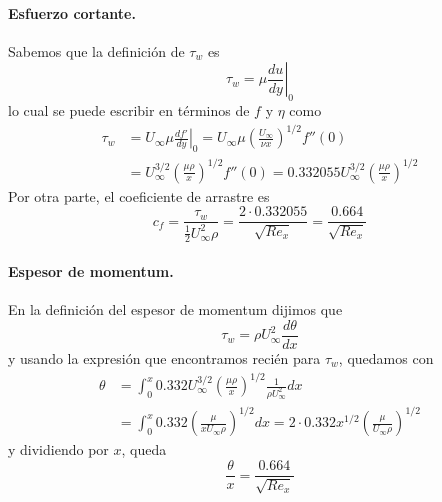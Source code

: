\paragraph*{Esfuerzo cortante.}
Sabemos que la definición de $\tau_w$ es
%
\begin{equation}
\tau_w = \left.\mu\frac{du}{dy}\right|_0
\end{equation}
%
lo cual se puede escribir en términos de $f$ y $\eta$ como
%
\begin{align}
\tau_w &= \left. U_\infty\mu \frac{df'}{dy}\right|_0 = U_\infty\mu \left(\frac{U_\infty}{\nu x}\right)^{1/2}f''(0) \nonumber\\
&= U_\infty^{3/2}\left(\frac{\mu\rho}{x}\right)^{1/2}f''(0) = 0.332055 U_\infty^{3/2}\left(\frac{\mu\rho}{x}\right)^{1/2} 
\end{align}
%
Por otra parte, el coeficiente de arrastre es
%
\begin{equation}
c_f = \frac{\tau_w}{\frac{1}{2}U_\infty^2\rho} = \frac{2\cdot0.332055}{\sqrt{Re_x}} = \frac{0.664}{\sqrt{Re_x}}
\end{equation}

\paragraph*{Espesor de momentum.}
En la definición del espesor de momentum dijimos que
%
\begin{equation}
\tau_w = \rho U_\infty^2 \frac{d\theta}{dx}
\end{equation}
%
y usando la expresión que encontramos recién para $\tau_w$, quedamos con
%
\begin{align}
\theta &= \int_0^x 0.332 U_\infty^{3/2}\left(\frac{\mu\rho}{x}\right)^{1/2} \frac{1}{\rho U_\infty^2} dx \nonumber\\
&= \int_0^x 0.332 \left(\frac{\mu}{xU_\infty\rho}\right)^{1/2} dx = 2\cdot0.332 x^{1/2}\left(\frac{\mu}{U_\infty\rho}\right)^{1/2}
\end{align}
%
y dividiendo por $x$, queda
%
\begin{equation}
\frac{\theta}{x} = \frac{0.664}{\sqrt{Re_x}}
\end{equation}
